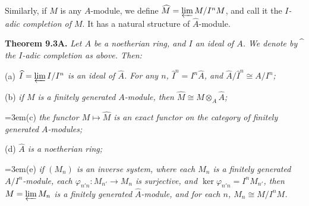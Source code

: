 {Similarly, if $M$ is any $A$-module, we define $\widehat M=\varprojlim M/I^nM$, and call it the \emph{$I$-adic completion of $M$}. It has a natural structure of $\widehat A$-module.

\medskip
\noindent\hypertarget{result-II-9.3A}{}\textbf{Theorem 9.3A.} \emph{Let $A$ be a noetherian ring, and $I$ an ideal of $A$. We denote by $\widehat{\vphantom A\ }$ the $I$-adic completion as above. Then:}

\noindent\hspace*{1.7em}\hypertarget{result-II-9.3A-a}{}(a) \emph{$\widehat I=\varprojlim I/I^n$ is an ideal of $\widehat A$. For any $n$, $\widehat I^n=I^n\widehat A$, and $\widehat A/\widehat I^n\cong A/I^n$;}

\noindent\hspace*{1.7em}\hypertarget{result-II-9.3A-b}{}(b) \emph{if $M$ is a finitely generated $A$-module, then $\widehat M\cong M\otimes_A\widehat A$;}

\noindent\hangindent=3em\hspace*{1.7em}\hypertarget{result-II-9.3A-c}{}(c) \emph{the functor $M\mapsto\widehat M$ is an exact functor on the category of finitely generated $A$-modules;}

\noindent\hspace*{1.7em}\hypertarget{result-II-9.3A-d}{}(d) \emph{$\widehat A$ is a noetherian ring;}

\noindent\hangindent=3em\hspace*{1.7em}\hypertarget{result-II-9.3A-e}{}(e) \emph{if $(M_n)$ is an inverse system, where each $M_n$ is a finitely generated $A/I^n$-module, each $\varphi_{n'n}\colon M_{n'}\to M_n$ is surjective, and $\ker\varphi_{n'n}=I^nM_{n'}$, then $M=\varprojlim M_n$ is a finitely generated $\widehat A$-module, and for each $n$, $M_n\cong M/I^nM$.}}
